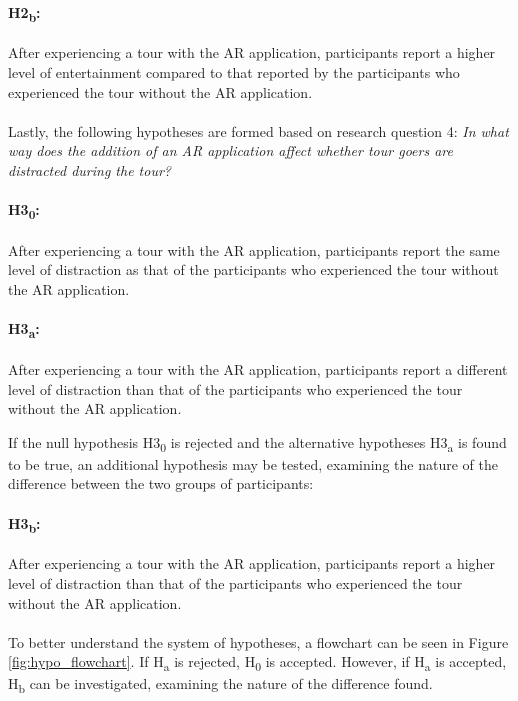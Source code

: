 \paragraph{H2\textsubscript{b}:} After experiencing a tour with the AR application, participants report a higher level of entertainment compared to that reported by the participants who experienced the tour without the AR application.\\
\\
Lastly, the following hypotheses are formed based on research question 4: \textit{In what way does the addition of an AR application affect whether tour goers are distracted during the tour?}

\paragraph{H3\textsubscript{0}:} After experiencing a tour with the AR application, participants report the same level of distraction as that of the participants who experienced the tour without the AR application.

\paragraph{H3\textsubscript{a}:}After experiencing a tour with the AR application, participants report a different level of distraction than that of the participants who experienced the tour without the AR application.\pagebreak

If the null hypothesis H3\textsubscript{0} is rejected and the alternative hypotheses H3\textsubscript{a} is found to be true, an additional hypothesis may be tested, examining the nature of the difference between the two groups of participants:

\paragraph{H3\textsubscript{b}:} After experiencing a tour with the AR application, participants report a higher level of distraction than that of the participants who experienced the tour without the AR application.\\
\\
To better understand the system of hypotheses, a flowchart can be seen in Figure \ref{fig:hypo_flowchart}. If H\textsubscript{a} is rejected, H\textsubscript{0} is accepted. However, if H\textsubscript{a} is accepted, H\textsubscript{b} can be investigated, examining the nature of the difference found.

